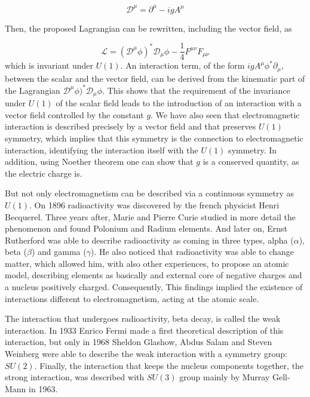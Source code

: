 \begin{equation}
  \label{eq:covderivU1}
  \mathcal{D}^{\mu}=\partial^{\mu}-igA^{\mu}
\end{equation}

Then, the proposed Lagrangian can be rewritten, including the vector field, as

\begin{equation}
  \label{eq:FullLagU1inv}
  \mathcal{L}=(\mathcal{D}^{\mu}\phi)^{*}\mathcal{D}_{\mu}\phi-\frac{1}{4}F^{\mu\nu}F_{\mu\nu}
\end{equation}which is invariant under $U(1)$. An interaction term, of the form $igA^{\mu}\phi^{*}\partial_{\mu}$, between the scalar and the vector field, can be derived from the kinematic part of the Lagrangian $\mathcal{D}^{\mu}\phi)^{*}\mathcal{D}_{\mu}\phi$. This shows that the requirement of the invariance under $U(1)$ of the scalar field leads to the introduction of an interaction with a vector field controlled by the constant $g$. We have also seen that electromagnetic interaction is described precisely by a vector field and that preserves $U(1)$ symmetry, which implies that this symmetry is the connection to electromagnetic interaction, identifying the interaction itself with the $U(1)$ symmetry. In addition, using Noether theorem one can show that $g$ is a conserved quantity, as the electric charge is.

But not only electromagnetism can be described via a continuous symmetry as $U(1)$. On 1896 radioactivity was discovered by the french physicist Henri Becquerel. Three years after, Marie and Pierre Curie studied in more detail the phenomenon and found Polonium and Radium elements. And later on, Ernst Rutherford was able to describe radioactivity as coming in three types, alpha ($\alpha$), beta ($\beta$) and gamma ($\gamma$). He also noticed that radioactivity was able to change matter, which allowed him, with also other experiences, to propose an atomic model, describing elements as basically and external core of negative charges and a nucleus positively charged. Consequently, This findings implied the existence of interactions different to electromagnetism, acting at the atomic scale.

The interaction that undergoes radioactivity, beta decay, is called the weak interaction. In 1933 Enrico Fermi made a first theoretical description of this interaction, but only in 1968 Sheldon Glashow, Abdus Salam and Steven Weinberg were able to describe the weak interaction with a symmetry group: $SU(2)$. Finally, the interaction that keeps the nucleus components together, the strong interaction, was described with $SU(3)$ group mainly by Murray Gell-Mann in 1963.

